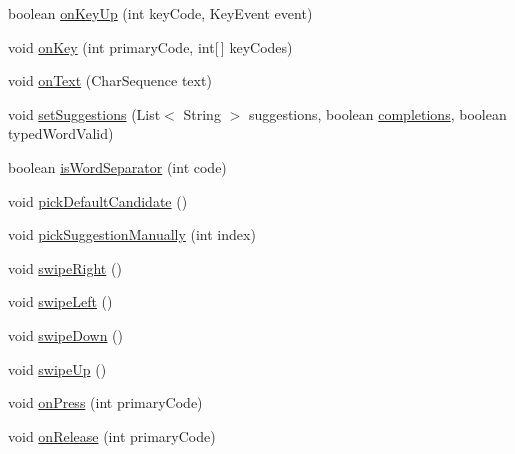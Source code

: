 \begin{DoxyCompactItemize}
\item 
boolean \hyperlink{classch_1_1zhaw_1_1ba10__bsha__1_1_1ime_1_1HandwritingIME_a3d39e17d6aa63cc1b2564dcb2022c8ec}{onKeyUp} (int keyCode, KeyEvent event)
\item 
void \hyperlink{classch_1_1zhaw_1_1ba10__bsha__1_1_1ime_1_1HandwritingIME_a6bf7a6751794c5bf24f686cbf94d7ebf}{onKey} (int primaryCode, int\mbox{[}$\,$\mbox{]} keyCodes)
\item 
void \hyperlink{classch_1_1zhaw_1_1ba10__bsha__1_1_1ime_1_1HandwritingIME_aaa0fc01a36b17c423c223f0dce23390d}{onText} (CharSequence text)
\item 
void \hyperlink{classch_1_1zhaw_1_1ba10__bsha__1_1_1ime_1_1HandwritingIME_a761d3a5ee4b8830684c9fe03641b6a62}{setSuggestions} (List$<$ String $>$ suggestions, boolean \hyperlink{classch_1_1zhaw_1_1ba10__bsha__1_1_1ime_1_1HandwritingIME_a8df4f47c35084abc7bf31d65b248c5be}{completions}, boolean typedWordValid)
\item 
boolean \hyperlink{classch_1_1zhaw_1_1ba10__bsha__1_1_1ime_1_1HandwritingIME_aeef9b5d4fa9f314d5bf17331645ba93b}{isWordSeparator} (int code)
\item 
void \hyperlink{classch_1_1zhaw_1_1ba10__bsha__1_1_1ime_1_1HandwritingIME_a6e2e375b97933b90f110199def80abfe}{pickDefaultCandidate} ()
\item 
void \hyperlink{classch_1_1zhaw_1_1ba10__bsha__1_1_1ime_1_1HandwritingIME_ada3cca347b6d9a39b3fb4d008d90dac8}{pickSuggestionManually} (int index)
\item 
void \hyperlink{classch_1_1zhaw_1_1ba10__bsha__1_1_1ime_1_1HandwritingIME_a5a27dd14331c21af3031ffcd38d802f4}{swipeRight} ()
\item 
void \hyperlink{classch_1_1zhaw_1_1ba10__bsha__1_1_1ime_1_1HandwritingIME_aab0d09eae40077fbdb87a21566a266ea}{swipeLeft} ()
\item 
void \hyperlink{classch_1_1zhaw_1_1ba10__bsha__1_1_1ime_1_1HandwritingIME_aa35f0cbc95d0b5623c29229e3a8ee2e5}{swipeDown} ()
\item 
void \hyperlink{classch_1_1zhaw_1_1ba10__bsha__1_1_1ime_1_1HandwritingIME_a76b1e0dc03f0b6d2641cf60325dee604}{swipeUp} ()
\item 
void \hyperlink{classch_1_1zhaw_1_1ba10__bsha__1_1_1ime_1_1HandwritingIME_abb77d1d11f616d5980ea16858a6b6190}{onPress} (int primaryCode)
\item 
void \hyperlink{classch_1_1zhaw_1_1ba10__bsha__1_1_1ime_1_1HandwritingIME_adf013e6d8fc9b5d0e567fe93f5f6511a}{onRelease} (int primaryCode)
\end{DoxyCompactItemize}
